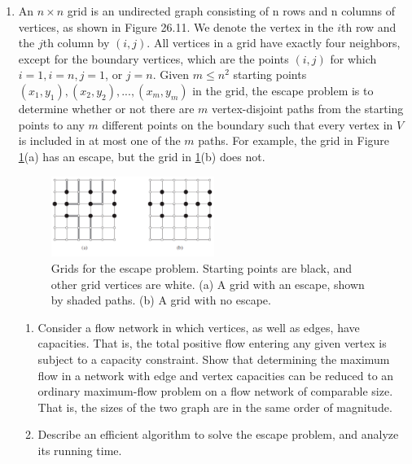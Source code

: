 \documentclass[12pt,a4paper]{article}
\theoremstyle{definition}
\begin{document}
\begin{enumerate}
	\item An $n\times n$ grid is an undirected graph consisting of n rows and n columns of vertices, as shown in Figure 26.11. We denote the vertex in the $i$th row and the $j$th column by $(i,j)$. All vertices in a grid have exactly four neighbors, except for the boundary vertices, which are the points $(i,j)$ for which $i = 1, i = n, j = 1$, or $j = n$.
    Given $m\leqslant n^2$ starting points $(x_1,y_1), (x_2, y_2), ... , (x_m, y_m)$ in the grid, the escape problem is to determine whether or not there are $m$ vertex-disjoint paths from the starting points to any $m$ different points on the boundary such that every vertex in $V$ is included in at most one of the $m$ paths. For example, the grid in Figure \ref{Fig-EscapeProblem}(a) has an escape, but the grid in \ref{Fig-EscapeProblem}(b) does not.
    \begin{figure}[!htbp]
	\centering
	\includegraphics[width=0.5\textwidth]{Fig-EscapeProblem.pdf}
	\caption{Grids for the escape problem. Starting points are black, and other grid vertices are white. (a) A grid with an escape, shown by shaded paths. (b) A grid with no escape.}
	\label{Fig-EscapeProblem}
	\end{figure}
    \begin{enumerate}
        \item Consider a flow network in which vertices, as well as edges, have capacities. That is, the total positive flow entering any given vertex is subject to a capacity constraint. Show that determining the maximum flow in a network with edge and vertex capacities can be reduced to an ordinary maximum-flow problem on a flow network of comparable size. That is, the sizes of the two graph are in the same order of magnitude.
        \item Describe an efficient algorithm to solve the escape problem, and analyze its running time.
    \end{enumerate}
    

\end{enumerate}
\end{document}
